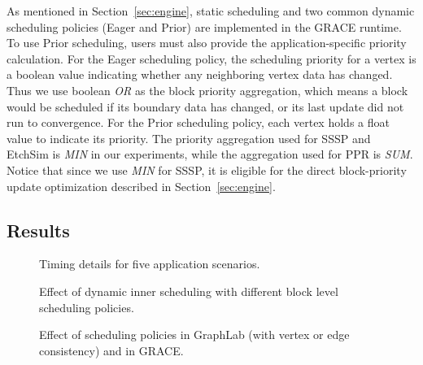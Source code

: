 As mentioned in Section~\ref{sec:engine}, static scheduling and 
two common dynamic scheduling policies (Eager and Prior) are 
implemented in the GRACE runtime.
To use Prior scheduling, users must also provide 
the application-specific priority calculation.
For the Eager scheduling policy, the scheduling priority for a vertex is a boolean value indicating whether any neighboring vertex data has changed.
Thus we use boolean \emph{OR} as the block priority aggregation, which means a block would be scheduled 
if its boundary data has changed, or its last update did not run to convergence. 
For the Prior scheduling policy, each vertex holds a float value to indicate its priority.
The priority aggregation used for SSSP and EtchSim is \emph{MIN} in our experiments, 
while the aggregation used for PPR is \emph{SUM}. Notice that since we use \emph{MIN}
for SSSP, it is eligible for the direct block-priority update
optimization 
described in
Section~\ref{sec:engine}.


\subsection{Results}

\begin{figure*}[ht!]

\caption{Timing details for five application scenarios.}
\label{fig:timingGrid}
\end{figure*}


\begin{figure*}[ht]
  
  \caption{Effect of dynamic inner scheduling with different block level scheduling policies.}
  \label{fig:dynamicinner}
\end{figure*}

\begin{figure*}[ht]
  
  \caption{Effect of scheduling policies in GraphLab (with vertex or
    edge consistency) and in GRACE.}
  \label{fig:graphlabCompare}
\end{figure*}




